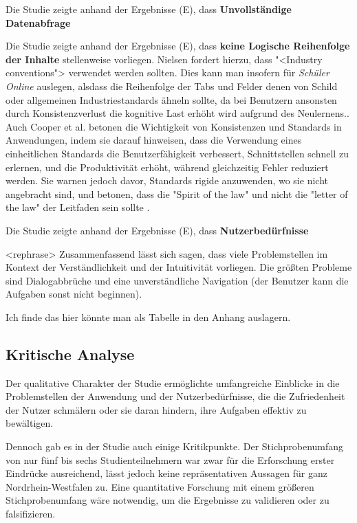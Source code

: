 Die Studie zeigte anhand der Ergebnisse (E), dass \textbf{Unvollständige Datenabfrage}

Die Studie zeigte anhand der Ergebnisse (E), dass \textbf{keine Logische Reihenfolge der Inhalte} stellenweise vorliegen. Nielsen fordert hierzu, dass "<Industry conventions"> \cite{Nielsen10} verwendet werden sollten. Dies kann man insofern für \textit{Schüler Online} auslegen, alsdass die Reihenfolge der Tabs und Felder denen von Schild oder allgemeinen Industriestandards ähneln sollte, da bei Benutzern ansonsten durch Konsistenzverlust die kognitive Last erhöht wird aufgrund des Neulernens.\cite{Nielsen10}. Auch Cooper et al. betonen die Wichtigkeit von Konsistenzen und Standards in Anwendungen, indem sie darauf hinweisen, dass die Verwendung eines einheitlichen Standards die Benutzerfähigkeit verbessert, Schnittstellen schnell zu erlernen, und die Produktivität erhöht, während gleichzeitig Fehler reduziert werden. Sie warnen jedoch davor, Standards rigide anzuwenden, wo sie nicht angebracht sind, und betonen, dass die "Spirit of the law" und nicht die "letter of the law" der Leitfaden sein sollte \cite{Cooper}.

Die Studie zeigte anhand der Ergebnisse (E), dass \textbf{Nutzerbedürfnisse}


<rephrase> Zusammenfassend lässt sich sagen, dass viele Problemstellen im Kontext der Verständlichkeit und der Intuitivität vorliegen. Die größten Probleme sind Dialogabbrüche und eine unverständliche Navigation (der Benutzer kann die Aufgaben sonst nicht beginnen).

Ich finde das hier könnte man als Tabelle in den Anhang auslagern.


\subsection{Kritische Analyse}
Der qualitative Charakter der Studie ermöglichte umfangreiche Einblicke in die Problemstellen der Anwendung und der Nutzerbedürfnisse, die die Zufriedenheit der Nutzer schmälern oder sie daran hindern, ihre Aufgaben effektiv zu bewältigen. 

Dennoch gab es in der Studie auch einige Kritikpunkte. Der Stichprobenumfang von nur fünf bis sechs Studienteilnehmern war zwar für die Erforschung erster Eindrücke ausreichend, lässt jedoch keine repräsentativen Aussagen für ganz Nordrhein-Westfalen zu. Eine quantitative Forschung mit einem größeren Stichprobenumfang wäre notwendig, um die Ergebnisse zu validieren oder zu falsifizieren.


